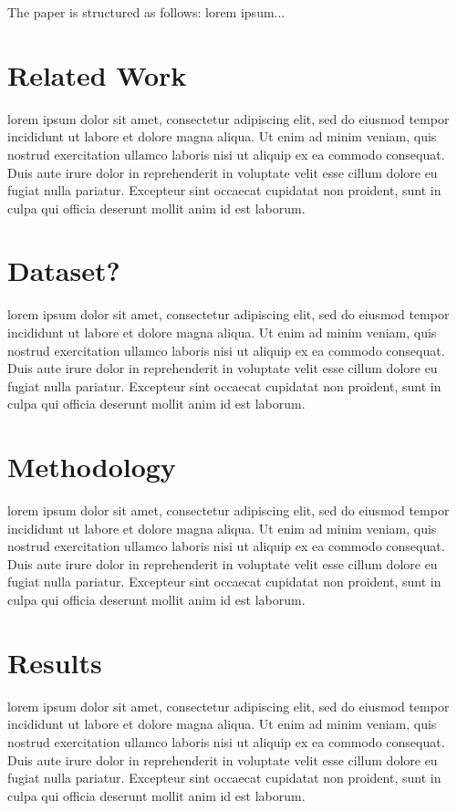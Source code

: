 \documentclass[conference]{IEEEtran}
\begin{document}
The paper is structured as follows: lorem ipsum...

\section{Related Work}
lorem ipsum dolor sit amet, consectetur adipiscing elit, sed do eiusmod tempor incididunt ut labore et dolore magna aliqua. Ut enim ad minim veniam, quis nostrud exercitation ullamco laboris nisi ut aliquip ex ea commodo consequat. Duis aute irure dolor in reprehenderit in voluptate velit esse cillum dolore eu fugiat nulla pariatur. Excepteur sint occaecat cupidatat non proident, sunt in culpa qui officia deserunt mollit anim id est laborum.

\section{Dataset?}
lorem ipsum dolor sit amet, consectetur adipiscing elit, sed do eiusmod tempor incididunt ut labore et dolore magna aliqua. Ut enim ad minim veniam, quis nostrud exercitation ullamco laboris nisi ut aliquip ex ea commodo consequat. Duis aute irure dolor in reprehenderit in voluptate velit esse cillum dolore eu fugiat nulla pariatur. Excepteur sint occaecat cupidatat non proident, sunt in culpa qui officia deserunt mollit anim id est laborum.

\section{Methodology}
lorem ipsum dolor sit amet, consectetur adipiscing elit, sed do eiusmod tempor incididunt ut labore et dolore magna aliqua. Ut enim ad minim veniam, quis nostrud exercitation ullamco laboris nisi ut aliquip ex ea commodo consequat. Duis aute irure dolor in reprehenderit in voluptate velit esse cillum dolore eu fugiat nulla pariatur. Excepteur sint occaecat cupidatat non proident, sunt in culpa qui officia deserunt mollit anim id est laborum.

\section{Results}
lorem ipsum dolor sit amet, consectetur adipiscing elit, sed do eiusmod tempor incididunt ut labore et dolore magna aliqua. Ut enim ad minim veniam, quis nostrud exercitation ullamco laboris nisi ut aliquip ex ea commodo consequat. Duis aute irure dolor in reprehenderit in voluptate velit esse cillum dolore eu fugiat nulla pariatur. Excepteur sint occaecat cupidatat non proident, sunt in culpa qui officia deserunt mollit anim id est laborum.
\end{document}
